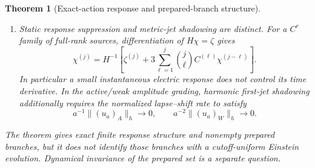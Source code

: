 \documentclass[11pt]{article}
\newtheorem{theorem}{Theorem}[section]
\theoremstyle{definition}
\theoremstyle{remark}
\begin{document}
\begin{theorem}[Exact-action response and prepared-branch structure]
\begin{enumerate}[label=\textup{(X\arabic*)},leftmargin=3em]
      about the original full scalar solve.
\item Static response suppression and metric-jet shadowing are distinct.  For
      a $C^r$ family of full-rank sources, differentiation of
      $H\chi=\zeta$ gives
      \begin{equation}
       \boxed{\chi^{(j)}=H^{-1}\left[\zeta^{(j)}
        +3\sum_{\ell=1}^j\binom j\ell C^{(\ell)}
          \chi^{(j-\ell)}\right].}
       \label{eq:main-exact-action-time-hierarchy}
      \end{equation}
      In particular a small instantaneous electric response does not control
      its time derivative.  In the active/weak amplitude grading, harmonic
      first-jet shadowing additionally requires the normalized lapse--shift
      rate to satisfy
      \begin{equation}
       a^{-1}\|(u_a)_A\|_h\to0,
       \qquad a^{-2}\|(u_a)_W\|_h\to0.
       \label{eq:main-exact-action-clock-test}
      \end{equation}
\end{enumerate}
The theorem gives exact finite response structure and nonempty prepared
branches, but it does not identify those branches with a cutoff-uniform
Einstein evolution.  Dynamical invariance of the prepared set is a separate
question.
\end{theorem}
\end{document}
